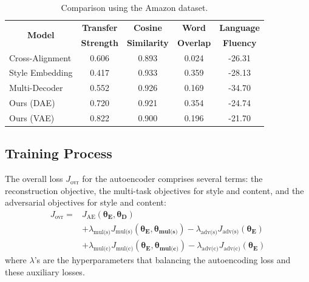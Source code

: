 \documentclass[letterpaper]{article} %
\newcommand{\tabh}[1]{\multicolumn{1}{c|}{\textbf{#1}}}
\newcommand{\tabc}[2]{\multicolumn{1}{|c||}{\multirow{#1}{*}{\textbf{#2}}}}
\newcommand{\loss}[1]{J_{\text{#1}}}
\newcommand{\hyp}[1]{\lambda_{\text{#1}}}
\newcommand{\nnweight}[1]{\bm{\theta_{\text{#1}}}}
\begin{document}
\begin{table}[ht]
	\centering
	\begin{tabular}{| l || c | c | c | c |}
		\hline
		\tabc{2}{Model}                            & \tabh{Transfer} & \tabh{Cosine}     & \tabh{Word}    & \tabh{Language} \\
		                                           & \tabh{Strength} & \tabh{Similarity} & \tabh{Overlap} & \tabh{Fluency}  \\
		\hline
		\hline
		Cross-Alignment \cite{shen2017style}       & 0.606           & 0.893             & 0.024          & -26.31          \\
		\hline
		Style Embedding \cite{fu2018style}         & 0.417           & 0.933             & 0.359          & -28.13          \\
		\hline
		Multi-Decoder \cite{zhao2018adversarially} & 0.552           & 0.926             & 0.169          & -34.70          \\
		\hline
		Ours (DAE)                                 & 0.720           & 0.921             & 0.354          & -24.74          \\
		\hline
		Ours (VAE)                                 & 0.822           & 0.900             & 0.196          & -21.70          \\
		\hline
	\end{tabular}
	\caption{Comparison using the Amazon dataset.}
	\label{tab:amazon-comparison-previous}
\end{table}

\subsection{Training Process}

The overall loss $\loss{ovr}$ for the autoencoder comprises several terms: the reconstruction objective, the multi-task objectives for style and content, and the adversarial objectives for style and content:
\begin{align}
	\loss{ovr} = & \loss{AE}(\nnweight{E}, \nnweight{D})  \nonumber                                                                   \\
	             & + \hyp{mul(s)} \loss{mul(s)} (\nnweight{E},\nnweight{mul(s)}) - \hyp{adv(s)} \loss{adv(s)}(\nnweight{E}) \nonumber \\
	             & + \hyp{mul(c)} \loss{mul(c)} (\nnweight{E},\nnweight{mul(c)}) - \hyp{adv(c)} \loss{adv(c)}(\nnweight{E})
\end{align}
where $\lambda$'s are the hyperparameters that balancing the autoencoding loss and these auxiliary losses.
\end{document}
